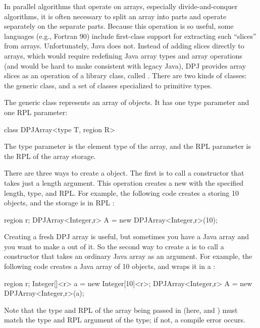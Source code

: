 In parallel algorithms that operate on arrays, especially
divide-and-conquer algorithms, it is often necessary to split an array
into parts and operate separately on the separate parts.  Because this
operation is so useful, some languages (e.g., Fortran 90) include
first-class support for extracting such ``slices'' from arrays.
Unfortunately, Java does not.  Instead of adding slices directly to
arrays, which would require redefining Java array types and array
operations (and would be hard to make consistent with legacy Java),
DPJ provides array slices as an operation of a library class, called
.  There are two kinds of  classes: the
generic  class, and a set of  classes
specialized to primitive types.

 The generic  class
represents an array of objects.  It has one type parameter and one RPL
parameter:
%
\begin{dpjlisting}
class DPJArray<type T, region R>
\end{dpjlisting}
%
The type parameter is the element type of the array, and the RPL
parameter is the RPL of the array storage.

 There are three ways to create a
 object.  The first is to call a constructor that takes
just a length argument.  This operation creates a new 
with the specified length, type, and RPL.  For example, the following
code creates a  storing 10  objects, and
the storage is in RPL :
%
\begin{dpjlisting}
region r;
DPJArray<Integer,r> A = new DPJArray<Integer,r>(10);
\end{dpjlisting}
%

Creating a fresh DPJ array is useful, but sometimes you have a Java
array and you want to make a  out of it.  So the second
way to create a  is to call a constructor that takes an
ordinary Java array as an argument.  For example, the following code
creates a Java array of 10  objects, and wraps it in a
:
%
\begin{dpjlisting}
region r;
Integer[]<r> a = new Integer[10]<r>;
DPJArray<Integer,r> A = new DPJArray<Integer,r>(a);
\end{dpjlisting}
%
Note that the type and RPL of the array being passed in (here,
 and ) must match the type and RPL argument of the
 type; if not, a compile error occurs.

